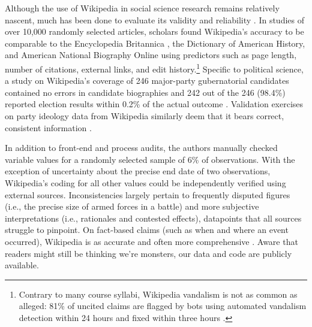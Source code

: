 \documentclass[fleqn,12pt]{article}
\begin{document}
Although the use of Wikipedia in social science research remains relatively nascent, much has been done to evaluate its validity and reliability \citep{greenstein_wikipediabiased_2012, mesgari_sumallhuman_2015, benjakob_clockworkwikipediabroad_2018}. In studies of over 10,000 randomly selected articles, scholars found Wikipedia’s accuracy to be comparable to the Encyclopedia Britannica \citep{blumenstock_automaticallyassessingquality_2008}, the Dictionary of American History, and American National Biography Online \citep{rector_comparisonwikipediaother_2008} using predictors such as page length, number of citations, external links, and edit history.\footnote{Contrary to many course syllabi, Wikipedia vandalism is not as common as alleged: 81\% of uncited claims are flagged by bots using automated vandalism detection within 24 hours and fixed within three hours \citep{adler_wikipediavandalismdetection_2011, tramullas_researchwikipediavandalism_2016}.} Specific to political science, a study on Wikipedia’s coverage of 246 major-party gubernatorial candidates contained no errors in candidate biographies and 242 out of the 246 (98.4\%) reported election results within 0.2\% of the actual outcome \citep{brown_wikipediadatasource_2011}. Validation exercises on party ideology data from Wikipedia similarly deem that it bears correct, consistent information \citep{gobel_comparativelegislatorsdatabase_2021, herrmann_partypositionswikipedia_2021}.

In addition to front-end and process audits, the authors manually checked variable values for a randomly selected sample of 6\% of observations. With the exception of uncertainty about the precise end date of two observations, Wikipedia's coding for all other values could be independently verified using external sources. Inconsistencies largely pertain to frequently disputed figures (i.e., the precise size of armed forces in a battle) and more subjective interpretations (i.e., rationales and contested effects), datapoints that all sources struggle to pinpoint. On fact-based claims (such as when and where an event occurred), Wikipedia is as accurate and often more comprehensive \citep{rector_comparisonwikipediaother_2008}. Aware that readers might still be thinking we're monsters, our data and code are publicly available.
\end{document}
